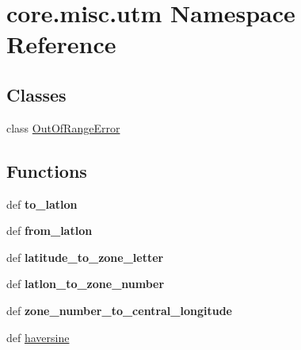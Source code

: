 \hypertarget{namespacecore_1_1misc_1_1utm}{\section{core.\+misc.\+utm Namespace Reference}
\label{namespacecore_1_1misc_1_1utm}
}
\subsection*{Classes}
\begin{DoxyCompactItemize}
\item 
class \hyperlink{classcore_1_1misc_1_1utm_1_1_out_of_range_error}{Out\+Of\+Range\+Error}
\end{DoxyCompactItemize}
\subsection*{Functions}
\begin{DoxyCompactItemize}
\item 
\hypertarget{namespacecore_1_1misc_1_1utm_ac93ab41b2ca2336d4b60d6ef7cfdb08b}{def {\bfseries to\+\_\+latlon}}\label{namespacecore_1_1misc_1_1utm_ac93ab41b2ca2336d4b60d6ef7cfdb08b}

\item 
\hypertarget{namespacecore_1_1misc_1_1utm_a88e845017868efe5f77ddd52527458d3}{def {\bfseries from\+\_\+latlon}}\label{namespacecore_1_1misc_1_1utm_a88e845017868efe5f77ddd52527458d3}

\item 
\hypertarget{namespacecore_1_1misc_1_1utm_a20648ab53a793fb1477e8d43e331ec53}{def {\bfseries latitude\+\_\+to\+\_\+zone\+\_\+letter}}\label{namespacecore_1_1misc_1_1utm_a20648ab53a793fb1477e8d43e331ec53}

\item 
\hypertarget{namespacecore_1_1misc_1_1utm_a6ee61c432aedef9c6cd0f43647361f54}{def {\bfseries latlon\+\_\+to\+\_\+zone\+\_\+number}}\label{namespacecore_1_1misc_1_1utm_a6ee61c432aedef9c6cd0f43647361f54}

\item 
\hypertarget{namespacecore_1_1misc_1_1utm_a44bb4b46db4d233d44369e80df724355}{def {\bfseries zone\+\_\+number\+\_\+to\+\_\+central\+\_\+longitude}}\label{namespacecore_1_1misc_1_1utm_a44bb4b46db4d233d44369e80df724355}

\item 
def \hyperlink{namespacecore_1_1misc_1_1utm_a4b4802f24ca6ff8fd7ae6c68425c9bdd}{haversine}
\end{DoxyCompactItemize}
